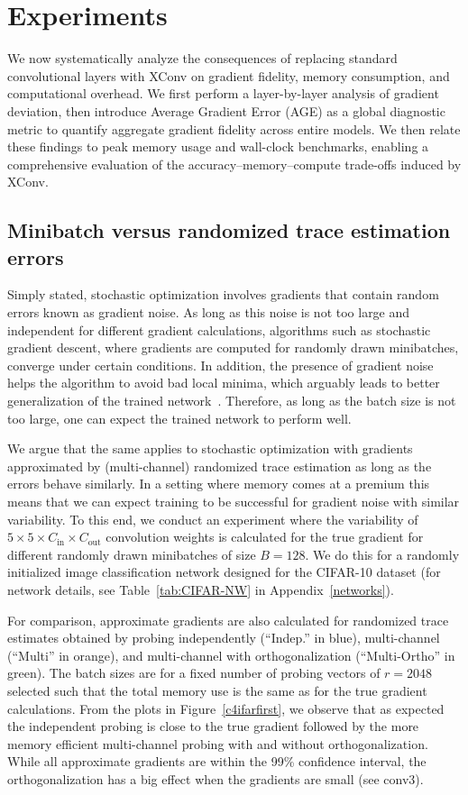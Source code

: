 \documentclass[10pt]{article}
\begin{document}
\section{Experiments}
\label{sec:experiments}

We now systematically analyze the consequences of replacing standard convolutional layers with XConv on gradient fidelity, memory consumption, and computational overhead. We first perform a layer-by-layer analysis of gradient deviation, then introduce Average Gradient Error (AGE) as a global diagnostic metric to quantify aggregate gradient fidelity across entire models. We then relate these findings to peak memory usage and wall-clock benchmarks, enabling a comprehensive evaluation of the accuracy--memory--compute trade-offs induced by XConv.

\subsection{Minibatch versus randomized trace estimation errors}
\label{subsec:error-analysis}
Simply stated, stochastic optimization involves gradients that contain random errors known as gradient noise. As long as this noise is not too large and independent for different gradient calculations, algorithms such as stochastic gradient descent, where gradients are computed for randomly drawn minibatches, converge under certain conditions. In addition, the presence of gradient noise helps the algorithm to avoid bad local minima, which arguably leads to better generalization of the trained network~\citep{neelakantan2015adding, huang20a}. Therefore, as long as the batch size is not too large, one can expect the trained network to perform well.

We argue that the same applies to stochastic optimization with gradients approximated by (multi-channel) randomized trace estimation as long as the errors behave similarly. In a setting where memory comes at a premium this means that we can expect training to be successful for gradient noise with similar variability. To this end, we conduct an experiment where the variability of $5\times 5\times C_{\text{in}}\times C_{\text{out}}$ convolution weights is calculated for the true gradient for different randomly drawn minibatches of size $B=128$. We do this for a randomly initialized image classification network designed for the CIFAR-10 dataset (for network details, see Table~\ref{tab:CIFAR-NW} in Appendix~\ref{networks}).

For comparison, approximate gradients are also calculated for randomized trace estimates obtained by probing independently (``Indep.'' in blue), multi-channel (``Multi'' in orange), and multi-channel with orthogonalization (``Multi-Ortho'' in green). The batch sizes are for a fixed number of probing vectors of $r=2048$ selected such that the total memory use is the same as for the true gradient calculations. From the plots in Figure~\ref{c4ifarfirst}, we observe that as expected the independent probing is close to the true gradient followed by the more memory efficient multi-channel probing with and without orthogonalization. While all approximate gradients are within the 99\% confidence interval, the orthogonalization has a big effect when the gradients are small (see conv3).
\end{document}
